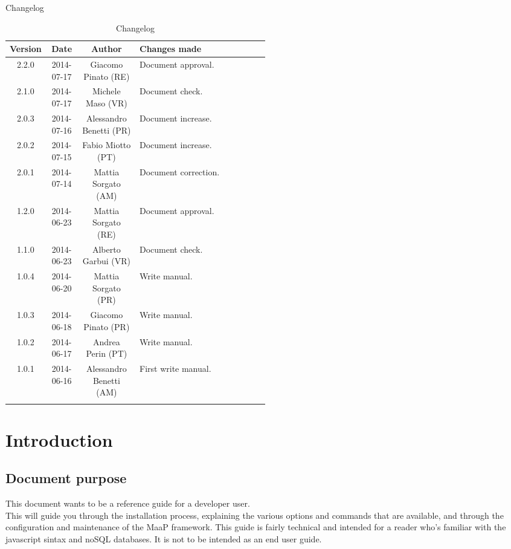 
\newpage
Changelog
\begin{center}
\begin{longtable}{|c|c|c|p{0.5\linewidth}|}
\toprule
\textbf{Version} & \textbf{Date} & \textbf{Author} & \textbf{Changes made}\\

\midrule
2.2.0 & 2014-07-17 & Giacomo Pinato (RE) & Document approval.\\
\midrule
2.1.0 & 2014-07-17 & Michele Maso (VR) & Document check.\\
\midrule
2.0.3 & 2014-07-16 & Alessandro Benetti (PR) & Document increase.\\
\midrule
2.0.2 & 2014-07-15 & Fabio Miotto (PT) & Document increase.\\
\midrule
2.0.1 & 2014-07-14 & Mattia Sorgato (AM) & Document correction.\\
\midrule
1.2.0 & 2014-06-23 & Mattia Sorgato (RE) & Document approval.\\
\midrule
1.1.0 & 2014-06-23 & Alberto Garbui (VR) & Document check.\\
\midrule
1.0.4 & 2014-06-20 & Mattia Sorgato (PR) & Write manual.\\
\midrule
1.0.3 & 2014-06-18 & Giacomo Pinato (PR) & Write manual.\\
\midrule
1.0.2 & 2014-06-17 & Andrea Perin (PT) & Write manual.\\
\midrule
1.0.1 & 2014-06-16 & Alessandro Benetti (AM) & First write manual.\\

\bottomrule
\caption{Changelog}
\label{tab:changelog}

\end{longtable}
\end{center}

\newpage
\tableofcontents

\newpage

\newpage
\section{Introduction}
\subsection{Document purpose}
This document wants to be a reference guide for a developer user. \\
This will guide you through the installation process, explaining the various options and commands that are available, and through the configuration and maintenance of the MaaP framework.
This guide is fairly technical and intended for a reader who's familiar with the javascript sintax and noSQL databases.
It is not to be intended as an end user guide.

